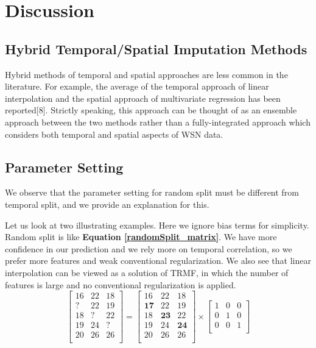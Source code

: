 \section{Discussion}  \label{sec:disc}

\subsection{Hybrid Temporal/Spatial Imputation Methods}

Hybrid methods of temporal and spatial approaches are less common in the literature.
For example, the average of the temporal approach of linear interpolation and the spatial approach of multivariate regression has been reported[8].
Strictly speaking, this approach can be thought of as an ensemble approach between the two methods rather than a fully-integrated approach which considers both temporal and spatial aspects of WSN data.

\subsection{Parameter Setting} \label{subsec:parameter}

We observe that the parameter setting for random split must be different from temporal split, and we provide an explanation for this. 

Let us look at two illustrating examples.
Here we ignore bias terms for simplicity.
Random split is like \textbf{Equation \ref{randomSplit_matrix}}.
We have more confidence in our prediction and we rely more on temporal correlation, so we prefer more features and weak conventional regularization.
We also see that linear interpolation can be viewed as a solution of TRMF, in which the number of features is large and no conventional regularization is applied. 
\begin{equation}
\label{randomSplit_matrix}
\begin{bmatrix}
16 & 22 & 18\\
 ? & 22 & 19\\
18 &  ?	& 22\\
19 & 24 &  ?\\
20 & 26 & 26\\
\end{bmatrix} 
= 
\begin{bmatrix}
16 & 22 & 18\\
\mathbf{17} & 22 & 19\\
18 & \mathbf{23}	& 22\\
19 & 24 & \mathbf{24}\\
20 & 26 & 26\\
\end{bmatrix} 
\times
\begin{bmatrix}
1 & 0 & 0\\
0 & 1 & 0\\
0 & 0 & 1\\
\end{bmatrix} 
\end{equation}

